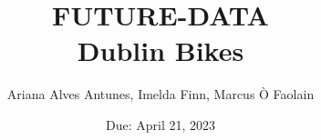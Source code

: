 \documentclass[12pt,letterpaper]{article}
\title{FUTURE-DATA\\Dublin Bikes}
\date{Due: April 21, 2023}
\author{Ariana Alves Antunes, Imelda Finn, Marcus Ò Faolain}
\begin{document}
	\maketitle

\end{document}
